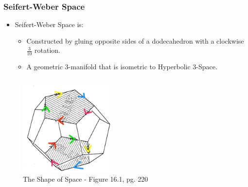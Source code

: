 \documentclass[13pt]{beamer}
\begin{document}
\begin{frame}
\frametitle{Seifert-Weber Space}
  \begin{itemize}
    \item \alert{Seifert-Weber Space} is:
          \begin{itemize}
             \item Constructed by gluing opposite sides of a dodecahedron with a clockwise $\frac{3}{10}$ rotation.
             \item A geometric 3-manifold that is isometric to Hyperbolic 3-Space.
           \end{itemize} 
  \end{itemize}

  \begin{columns}[c] %
     \centering
      \begin{figure}
        \includegraphics[height=4.75cm]{./img/three_tenths}
        \caption{The Shape of Space - Figure 16.1, pg. 220}
      \end{figure}
  \end{columns}
\end{frame}
\end{document}
